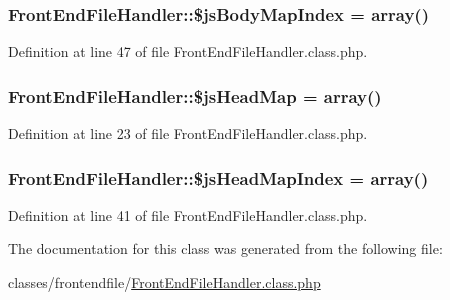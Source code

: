 \subsubsection[{\texorpdfstring{\$js\+Body\+Map\+Index}{$jsBodyMapIndex}}]{\setlength{\rightskip}{0pt plus 5cm}Front\+End\+File\+Handler\+::\$js\+Body\+Map\+Index = array()}\hypertarget{classFrontEndFileHandler_aba61415d3f993f1f6b9cddc0024f50b1}{}\label{classFrontEndFileHandler_aba61415d3f993f1f6b9cddc0024f50b1}


Definition at line 47 of file Front\+End\+File\+Handler.\+class.\+php.

\subsubsection[{\texorpdfstring{\$js\+Head\+Map}{$jsHeadMap}}]{\setlength{\rightskip}{0pt plus 5cm}Front\+End\+File\+Handler\+::\$js\+Head\+Map = array()}\hypertarget{classFrontEndFileHandler_ab434f9c8c874aaf8186e259dff95d116}{}\label{classFrontEndFileHandler_ab434f9c8c874aaf8186e259dff95d116}


Definition at line 23 of file Front\+End\+File\+Handler.\+class.\+php.

\subsubsection[{\texorpdfstring{\$js\+Head\+Map\+Index}{$jsHeadMapIndex}}]{\setlength{\rightskip}{0pt plus 5cm}Front\+End\+File\+Handler\+::\$js\+Head\+Map\+Index = array()}\hypertarget{classFrontEndFileHandler_a151a55b31ffaec411a86b7f618eed4ac}{}\label{classFrontEndFileHandler_a151a55b31ffaec411a86b7f618eed4ac}


Definition at line 41 of file Front\+End\+File\+Handler.\+class.\+php.



The documentation for this class was generated from the following file\+:\begin{DoxyCompactItemize}
\item 
classes/frontendfile/\hyperlink{FrontEndFileHandler_8class_8php}{Front\+End\+File\+Handler.\+class.\+php}\end{DoxyCompactItemize}
